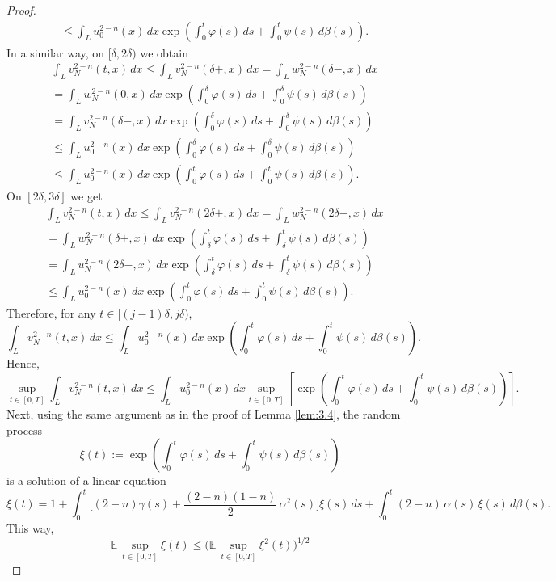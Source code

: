 \documentclass[a4paper,12pt]{article}
\numberwithin{equation}{section}
\begin{document}
\begin{proof}
\begin{align*}
& \leq \int_{L} u_0^{2-n}(x)\,dx
\exp\left( \int_0^t \varphi(s)\,ds + \int_0^t \psi(s)\,d\beta(s) \right).
\end{align*}
In a similar way, on $[\delta,2\delta)$ we obtain
\begin{align*}
& \int_{L} v_N^{2-n}(t,x)\,dx \le \int_{L} v_N^{2-n}(\delta+,x)\,dx = \int_{L} w_N^{2-n}(\delta-,x)\,dx  \\
& = \int_{L} w_N^{2-n}(0,x)\,dx
\exp\left( \int_0^\delta \varphi(s)\,ds + \int_0^\delta \psi(s)\,d\beta(s) \right)\\ 
& =  \int_{L} v_N^{2-n}(\delta-,x)\,dx
\exp\left( \int_0^\delta \varphi(s)\,ds + \int_0^\delta \psi(s)\,d\beta(s) \right)\\
& \le \int_{L} u_0^{2-n}(x)\,dx
\exp\left( \int_0^\delta \varphi(s)\,ds + \int_0^\delta \psi(s)\,d\beta(s) \right) \\
& \le \int_{L} u_0^{2-n}(x)\,dx
\exp\left( \int_0^t \varphi(s)\,ds + \int_0^t \psi(s)\,d\beta(s) \right).
\end{align*}
On $[2\delta,3\delta]$ we get
\begin{align*}
& \int_{L} v_N^{2-n}(t,x)\,dx \le \int_{L} v_N^{2-n}(2\delta+,x)\,dx = \int_{L} w_N^{2-n}(2\delta-,x)\,dx  \\
& = \int_{L} w_N^{2-n}(\delta+,x)\,dx
\exp\left( \int_\delta^t \varphi(s)\,ds + \int_\delta^t \psi(s)\,d\beta(s) \right)\\ 
& =  \int_{L} u_N^{2-n}(2\delta-,x)\,dx
\exp\left( \int_\delta^t \varphi(s)\,ds + \int_\delta^t \psi(s)\,d\beta(s) \right)\\
& \le \int_{L} u_0^{2-n}(x)\,dx
\exp\left( \int_0^t \varphi(s)\,ds + \int_0^t \psi(s)\,d\beta(s) \right).
\end{align*}
Therefore, for any $t \in [(j-1)\delta, j\delta)$,
\[
\int_{L} v_N^{2-n}(t,x)\,dx
\le
\int_{L} u_0^{2-n}(x)\,dx
\exp\left( \int_0^t \varphi(s)\,ds + \int_0^t \psi(s)\,d\beta(s) \right).
\]
Hence,
\[
\sup_{t \in [0,T]}
\int_{L} v_N^{2-n}(t,x)\,dx
\le
\int_{L} u_0^{2-n}(x)\,dx
\sup_{t \in [0,T]}\left[
\exp\left( \int_0^t \varphi(s)\,ds + \int_0^t \psi(s)\,d\beta(s) \right) \right].
\]
Next, using the same argument as in the proof of Lemma \ref{lem:3.4}, the random process
\[
\xi(t)
:=
\exp\left(
\int_0^t \varphi(s)\,ds
+
\int_0^t \psi(s)\,d\beta(s)
\right)
\]
is a solution of a linear equation
\[
\xi(t)
= 1
+ \int_{0}^{t}
\Big[
(2-n) \gamma(s)
+ \frac{(2-n)(1-n)}{2}\,\alpha^2(s)
\Big] \xi(s)\,ds
+ \int_{0}^{t} (2-n)\, \alpha(s) \,\xi(s)\,d\beta(s).
\]
This way,
\[
\mathbb{E}\,\sup_{t\in[0,T]} \xi(t)
\le
\Big(\mathbb{E}\,\sup_{t\in[0,T]} \xi^2(t)\Big)^{1/2}
\]
\end{proof}
\end{document}

